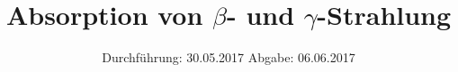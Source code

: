 


\subject{V704}
\title{\texorpdfstring{Absorption von $\beta$- und $\gamma$-Strahlung}{}}
\date{
	Durchführung: 30.05.2017
	\hspace{4em}
	Abgabe: 06.06.2017
}


	\maketitle
	\newpage
	\tableofcontents
	\newpage
	
	
	
	
	
	
	\newpage
	
	\printbibliography

